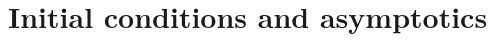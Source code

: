 \documentclass[%
 aip,
 jmp,%
 amsmath,amssymb,
 reprint,%
]{revtex4-2}
\begin{document}






\section{\label{sec:Condiciones iniciales}Initial conditions and asymptotics}
\end{document}
